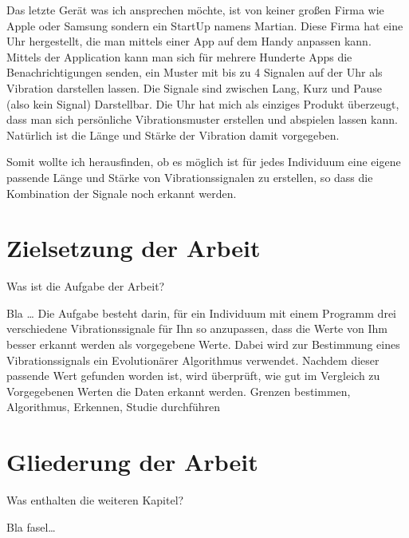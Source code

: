 Das letzte Gerät was ich ansprechen möchte, ist von keiner großen Firma wie Apple oder Samsung sondern ein StartUp namens Martian. Diese Firma hat eine Uhr hergestellt, die man mittels einer App auf dem Handy anpassen kann. Mittels der Application kann man sich für mehrere Hunderte Apps die Benachrichtigungen senden, ein Muster mit bis zu 4 Signalen auf der Uhr als Vibration darstellen lassen. Die Signale sind zwischen Lang, Kurz und Pause (also kein Signal) Darstellbar. 
Die Uhr hat mich als einziges Produkt überzeugt, dass man sich persönliche Vibrationsmuster erstellen und abspielen lassen kann. Natürlich ist die Länge und Stärke der Vibration damit vorgegeben.

Somit wollte ich herausfinden, ob es möglich ist für jedes Individuum eine eigene passende Länge und Stärke von Vibrationssignalen zu erstellen, so dass die Kombination der Signale noch erkannt werden.
 

\section{Zielsetzung der Arbeit}
\label{ch:Einleitung:sec:Zielsetzung}

Was ist die Aufgabe der Arbeit? 

Bla \ldots
Die Aufgabe besteht darin, für ein Individuum mit einem Programm drei verschiedene Vibrationssignale für Ihn so anzupassen, dass die Werte von Ihm besser erkannt werden als vorgegebene Werte. Dabei wird zur Bestimmung eines Vibrationssignals ein Evolutionärer Algorithmus verwendet. Nachdem dieser passende Wert gefunden worden ist, wird überprüft, wie gut im Vergleich zu Vorgegebenen Werten die Daten erkannt werden.
Grenzen bestimmen,
Algorithmus,
Erkennen,
Studie durchführen


\section{Gliederung der Arbeit}
\label{ch:Einleitung:sec:Gliederung}

Was enthalten die weiteren Kapitel?

Bla fasel\ldots

